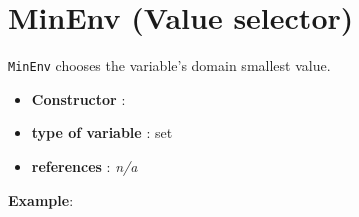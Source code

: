 \section{MinEnv (Value selector)}\label{minenv:minenvvalselector}\hypertarget{minenv:minenvvalselector}{}
\begin{notedef}
  \texttt{MinEnv} chooses the variable's domain smallest value.
\end{notedef}

\begin{itemize}
	\item \textbf{Constructor} : 
	\item \textbf{type of variable} : set
	\item \textbf{references} : \emph{n/a}
\end{itemize}

\textbf{Example}:
%

